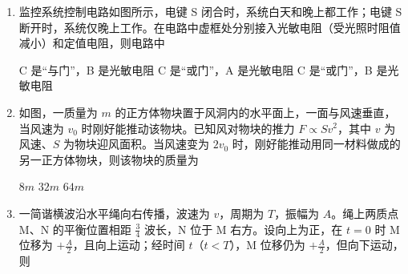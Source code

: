 \documentclass[\gkver]{gaokaozhenti}
\begin{document}
\begin{enumerate}

\item
监控系统控制电路如图所示，电键 S 闭合时，系统白天和晚上都工作；电键 S 断开时，系统仅晚上工作。在电路中虚框处分别接入光敏电阻（受光照时阻值减小）和定值电阻，则电路中

\onepicture[w=5.00cm]{}

{C 是“与门”，B 是光敏电阻}
{C 是“或门”，A 是光敏电阻}
{C 是“或门”，B 是光敏电阻}


\item
如图，一质量为 $m$ 的正方体物块置于风洞内的水平面上，一面与风速垂直，当风速为 $v_{0}$ 时刚好能推动该物块。已知风对物块的推力 $F\propto Sv^{2}$，其中 $v$ 为风速、$S$ 为物块迎风面积。当风速变为 $2v_{0}$ 时，刚好能推动用同一材料做成的另一正方体物块，则该物块的质量为

\onepicture[w=3.05cm]{}

{$8m$}
{$32m$}
{$64m$}


\item
一简谐横波沿水平绳向右传播，波速为 $v$，周期为 $T$，振幅为 $A$。绳上两质点 M、N 的平衡位置相距 $\frac{3}{4}$ 波长，N 位于 M 右方。设向上为正，在 $t=0$ 时 M 位移为 $+\frac{A}{2}$，且向上运动；经时间 $t$（$t<T$），M 位移仍为 $+\frac{A}{2}$，但向下运动，则


\end{enumerate}
\end{document}
